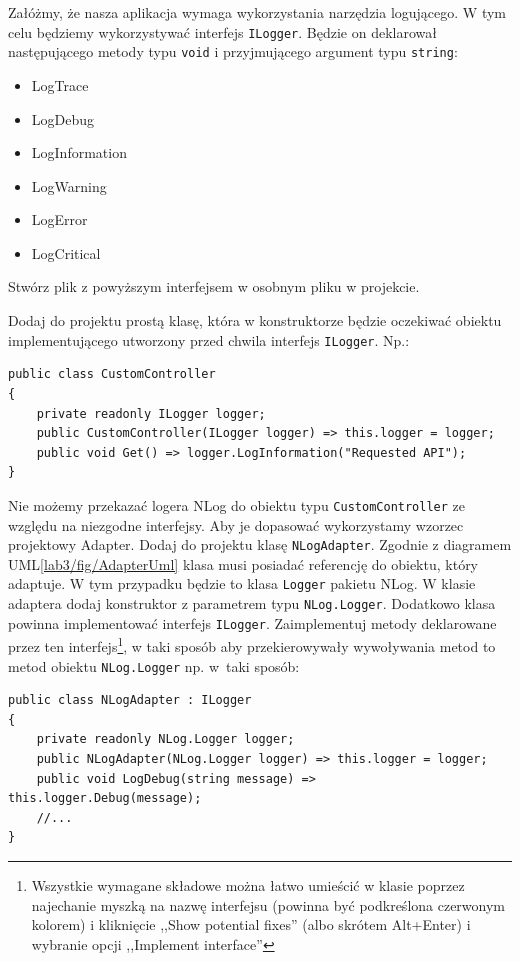 Załóżmy, że nasza aplikacja wymaga wykorzystania narzędzia logującego. W tym celu będziemy wykorzystywać interfejs \texttt{ILogger}. Będzie on deklarował następującego metody typu \texttt{void} i przyjmującego argument typu \texttt{string}:
\begin{itemize}
	\item LogTrace
	\item LogDebug
	\item LogInformation
	\item LogWarning
	\item LogError
	\item LogCritical
\end{itemize}
Stwórz plik z powyższym interfejsem w osobnym pliku w projekcie. 

Dodaj do projektu prostą klasę, która w konstruktorze będzie oczekiwać obiektu implementującego utworzony przed chwila interfejs \texttt{ILogger}. Np.:
\begin{lstlisting}[caption={Przykład klasy wykorzystującej obiekt implementujący \texttt{ILogger}}, label={lab3/lst/customControllerWithLogger}]
public class CustomController
{
	private readonly ILogger logger;
	public CustomController(ILogger logger) => this.logger = logger;
	public void Get() => logger.LogInformation("Requested API");
}
\end{lstlisting}

Nie możemy przekazać logera NLog do obiektu typu \texttt{CustomController} ze względu na niezgodne interfejsy. Aby je dopasować wykorzystamy wzorzec projektowy Adapter. Dodaj do projektu klasę \texttt{NLogAdapter}. Zgodnie z diagramem UML\ref{lab3/fig/AdapterUml} klasa musi posiadać referencję do obiektu, który adaptuje. W tym przypadku będzie to klasa \texttt{Logger} pakietu NLog. W klasie adaptera dodaj konstruktor z parametrem typu \texttt{NLog.Logger}. Dodatkowo klasa powinna implementować interfejs \texttt{ILogger}. Zaimplementuj metody deklarowane przez ten interfejs\footnote{Wszystkie wymagane składowe można łatwo umieścić w klasie poprzez najechanie myszką na nazwę interfejsu (powinna być podkreślona czerwonym kolorem) i kliknięcie ,,Show potential fixes'' (albo skrótem Alt+Enter) i wybranie opcji ,,Implement interface''}, w taki sposób aby przekierowywały wywoływania metod to metod obiektu \texttt{NLog.Logger} np. w~taki sposób:
\begin{lstlisting}[caption={Fragment klasy adaptera dla pakietu NLog}, label={lab3/lst/nlogAdapter}]
 public class NLogAdapter : ILogger
{
	private readonly NLog.Logger logger;	
	public NLogAdapter(NLog.Logger logger) => this.logger = logger;	
	public void LogDebug(string message) => this.logger.Debug(message);	
	//...
}
\end{lstlisting}


